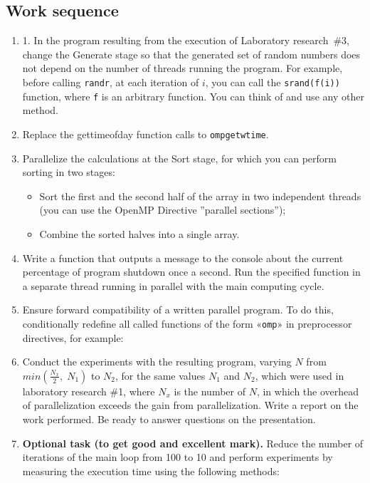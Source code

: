 { %
	\subsection{Work sequence}
	\begin{enumerate}
		\item1.	In the program resulting from the execution of Laboratory research~\#3, change the Generate stage so that the generated set of random numbers does not depend on the number of threads running the program. For example, before calling \texttt{rand\textunderscore r},  at each iteration of $i$, you can call the \texttt{srand(f(i))} function, where \texttt{f} is an arbitrary function. You can think of and use any other method.
		\item Replace the gettimeofday function calls to \texttt{omp\textunderscore get\textunderscore wtime}.
		\item Parallelize the calculations at the Sort stage, for which you can perform sorting in two stages:
			\begin{itemize}
				\item Sort the first and the second half of the array in two independent threads (you can use the OpenMP Directive ''parallel sections''); 
				\item Combine the sorted halves into a single array.
			\end{itemize}
		\item Write a function that outputs a message to the console about the current percentage of program shutdown once a second. Run the specified function in a separate thread running in parallel with the main computing cycle.
		\item Ensure forward compatibility of a written parallel program. To do this, conditionally redefine all called functions of the form «\texttt{omp\textunderscore *}» in preprocessor directives, for example:
			\begin{figure}[H]
				
			\end{figure}
		\item Conduct the experiments with the resulting program, varying $N$ from $min(\frac{N_x}{2},\;N_1)$ to $N_2$, for the same values $N_1$ and $N_2$, which were used in laboratory research \#1, where $N_x$ is the number of $N$, in which the overhead of parallelization exceeds the gain from parallelization. Write a report on the work performed. Be ready to answer questions on the presentation.
		\item\textbf{Optional task (to get good and excellent mark).} Reduce the number of iterations of the main loop from 100 to 10 and perform experiments by measuring the execution time using the following methods:

\end{enumerate}}
